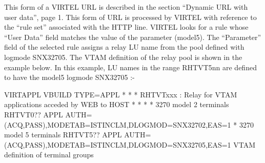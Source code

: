 \documentclass[letterpaper,10pt,english]{sphinxmanual}
\begin{document}
\begin{sphinxVerbatim}[commandchars=\\\{\}]
\end{sphinxVerbatim}

This form of a VIRTEL URL is described in the section “Dynamic URL with user data”, page 1. This form of URL is processed by VIRTEL with reference to the “rule set” associated with the HTTP line. VIRTEL looks for a rule whose “User Data” field matches the value of the parameter (model5). The “Parameter” field of the selected rule assigns a relay LU name from the pool defined with logmode SNX32705. The VTAM definition of the relay pool is shown in the example below. In this example, LU names in the range RHTVT5nn are defined to have the
model5 logmode SNX32705 :-

\begin{sphinxVerbatim}[commandchars=\\\{\}]
VIRTAPPL VBUILD TYPE=APPL
* \PYGZhy{}\PYGZhy{}\PYGZhy{}\PYGZhy{}\PYGZhy{}\PYGZhy{}\PYGZhy{}\PYGZhy{}\PYGZhy{}\PYGZhy{}\PYGZhy{}\PYGZhy{}\PYGZhy{}\PYGZhy{}\PYGZhy{}\PYGZhy{}\PYGZhy{}\PYGZhy{}\PYGZhy{}\PYGZhy{}\PYGZhy{}\PYGZhy{}\PYGZhy{}\PYGZhy{}\PYGZhy{}\PYGZhy{}\PYGZhy{}\PYGZhy{}\PYGZhy{}\PYGZhy{}\PYGZhy{}\PYGZhy{}\PYGZhy{}\PYGZhy{}\PYGZhy{}\PYGZhy{}\PYGZhy{}\PYGZhy{}\PYGZhy{}\PYGZhy{}\PYGZhy{}\PYGZhy{}\PYGZhy{}\PYGZhy{}\PYGZhy{}\PYGZhy{}\PYGZhy{}\PYGZhy{}\PYGZhy{}\PYGZhy{}\PYGZhy{}\PYGZhy{}\PYGZhy{}\PYGZhy{}\PYGZhy{}\PYGZhy{}\PYGZhy{}\PYGZhy{}\PYGZhy{}\PYGZhy{}\PYGZhy{}\PYGZhy{}\PYGZhy{}\PYGZhy{}\PYGZhy{}\PYGZhy{} *
* RHTVTxxx : Relay for VTAM applications acceded by WEB to HOST *
* \PYGZhy{}\PYGZhy{}\PYGZhy{}\PYGZhy{}\PYGZhy{}\PYGZhy{}\PYGZhy{}\PYGZhy{}\PYGZhy{}\PYGZhy{}\PYGZhy{}\PYGZhy{}\PYGZhy{}\PYGZhy{}\PYGZhy{}\PYGZhy{}\PYGZhy{}\PYGZhy{}\PYGZhy{}\PYGZhy{}\PYGZhy{}\PYGZhy{}\PYGZhy{}\PYGZhy{}\PYGZhy{}\PYGZhy{}\PYGZhy{}\PYGZhy{}\PYGZhy{}\PYGZhy{}\PYGZhy{}\PYGZhy{}\PYGZhy{}\PYGZhy{}\PYGZhy{}\PYGZhy{}\PYGZhy{}\PYGZhy{}\PYGZhy{}\PYGZhy{}\PYGZhy{}\PYGZhy{}\PYGZhy{}\PYGZhy{}\PYGZhy{}\PYGZhy{}\PYGZhy{}\PYGZhy{}\PYGZhy{}\PYGZhy{}\PYGZhy{}\PYGZhy{}\PYGZhy{}\PYGZhy{}\PYGZhy{}\PYGZhy{}\PYGZhy{}\PYGZhy{}\PYGZhy{}\PYGZhy{}\PYGZhy{}\PYGZhy{}\PYGZhy{}\PYGZhy{}\PYGZhy{}\PYGZhy{} *
* 3270 model 2 terminals
RHTVT0?? APPL AUTH=(ACQ,PASS),MODETAB=ISTINCLM,DLOGMOD=SNX32702,EAS=1
* 3270 model 5 terminals
RHTVT5?? APPL AUTH=(ACQ,PASS),MODETAB=ISTINCLM,DLOGMOD=SNX32705,EAS=1
VTAM definition of terminal groups
\end{sphinxVerbatim}
\end{document}
